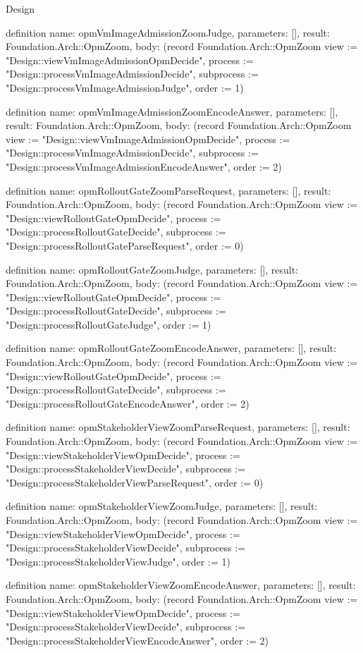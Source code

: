 \begin{lexlean}{Design}
\begin{semanticmodule}
definition{
  name: opmVmImageAdmissionZoomJudge,
  parameters: [],
  result: Foundation.Arch::OpmZoom,
  body: (record Foundation.Arch::OpmZoom {view := "Design::viewVmImageAdmissionOpmDecide", process := "Design::processVmImageAdmissionDecide", subprocess := "Design::processVmImageAdmissionJudge", order := 1})
}

definition{
  name: opmVmImageAdmissionZoomEncodeAnswer,
  parameters: [],
  result: Foundation.Arch::OpmZoom,
  body: (record Foundation.Arch::OpmZoom {view := "Design::viewVmImageAdmissionOpmDecide", process := "Design::processVmImageAdmissionDecide", subprocess := "Design::processVmImageAdmissionEncodeAnswer", order := 2})
}

definition{
  name: opmRolloutGateZoomParseRequest,
  parameters: [],
  result: Foundation.Arch::OpmZoom,
  body: (record Foundation.Arch::OpmZoom {view := "Design::viewRolloutGateOpmDecide", process := "Design::processRolloutGateDecide", subprocess := "Design::processRolloutGateParseRequest", order := 0})
}

definition{
  name: opmRolloutGateZoomJudge,
  parameters: [],
  result: Foundation.Arch::OpmZoom,
  body: (record Foundation.Arch::OpmZoom {view := "Design::viewRolloutGateOpmDecide", process := "Design::processRolloutGateDecide", subprocess := "Design::processRolloutGateJudge", order := 1})
}

definition{
  name: opmRolloutGateZoomEncodeAnswer,
  parameters: [],
  result: Foundation.Arch::OpmZoom,
  body: (record Foundation.Arch::OpmZoom {view := "Design::viewRolloutGateOpmDecide", process := "Design::processRolloutGateDecide", subprocess := "Design::processRolloutGateEncodeAnswer", order := 2})
}

definition{
  name: opmStakeholderViewZoomParseRequest,
  parameters: [],
  result: Foundation.Arch::OpmZoom,
  body: (record Foundation.Arch::OpmZoom {view := "Design::viewStakeholderViewOpmDecide", process := "Design::processStakeholderViewDecide", subprocess := "Design::processStakeholderViewParseRequest", order := 0})
}

definition{
  name: opmStakeholderViewZoomJudge,
  parameters: [],
  result: Foundation.Arch::OpmZoom,
  body: (record Foundation.Arch::OpmZoom {view := "Design::viewStakeholderViewOpmDecide", process := "Design::processStakeholderViewDecide", subprocess := "Design::processStakeholderViewJudge", order := 1})
}

definition{
  name: opmStakeholderViewZoomEncodeAnswer,
  parameters: [],
  result: Foundation.Arch::OpmZoom,
  body: (record Foundation.Arch::OpmZoom {view := "Design::viewStakeholderViewOpmDecide", process := "Design::processStakeholderViewDecide", subprocess := "Design::processStakeholderViewEncodeAnswer", order := 2})
}


\end{semanticmodule}
\end{lexlean}
